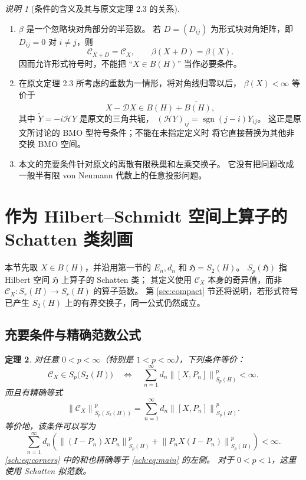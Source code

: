 \documentclass[UTF8,11pt,a4paper,fontset=fandol]{ctexart}
\newtheorem{theorem}{定理}[section]
\theoremstyle{remark}
\newtheorem{remark}[theorem]{说明}
\newcommand{\DD}{\mathcal D}
\newcommand{\TriH}{\mathcal H}
\newcommand{\CC}{\mathcal C}
\newcommand{\norm}[1]{\left\lVert #1\right\rVert}
\newcommand{\HS}{\mathfrak H}
\numberwithin{equation}{section}
\begin{document}
\begin{remark}[条件的含义及其与原文定理 2.3 的关系]
\leavevmode
\begin{enumerate}[label=\textup{(\arabic*)}]
 \item $\beta$ 是一个忽略块对角部分的半范数。
 若 $D=(D_{ij})$ 为形式块对角矩阵，即 $D_{ij}=0$ 对 $i\ne j$，则
 \[
  \CC_{X+D}=\CC_X,\qquad\beta(X+D)=\beta(X).
 \]
 因而允许形式符号时，不能把 ``$X\in B(H)$'' 当作必要条件。
 \item 在原文定理 2.3 所考虑的重数为一情形，将对角线归零以后，
 $\beta(X)<\infty$ 等价于
 \[
 X-\DD X\in B(H)+\widetilde{B(H)},
 \]
 其中 $\widetilde Y=-i\TriH Y$ 是原文的三角共轭，
 $(\TriH Y)_{ij}=\operatorname{sgn}(j-i)Y_{ij}$。
 这正是原文所讨论的 BMO 型符号条件；不能在未指定定义时
 将它直接替换为其他非交换 BMO 空间。
 \item 本文的充要条件针对原文的离散有限秩巢和左乘交换子。
 它没有把问题改成一般半有限 von Neumann 代数上的任意投影问题。
\end{enumerate}
\end{remark}

\section{作为 Hilbert--Schmidt 空间上算子的 Schatten 类刻画}

本节先取 $X\in B(H)$，并沿用第一节的 $E_n,d_n$ 和 $\HS=S_2(H)$。
$S_p(\HS)$ 指 Hilbert 空间 $\HS$ 上算子的 Schatten 类；
其定义使用 $\CC_X$ 本身的奇异值，而非 $\CC_X:S_r(H)\to S_r(H)$ 的算子范数。
第 \ref{sec:compact} 节还将说明，若形式符号已产生 $S_2(H)$ 上的有界交换子，同一公式仍然成立。

\subsection{充要条件与精确范数公式}

\begin{theorem}\label{sch:thm:main}
对任意 $0<p<\infty$（特别是 $1<p<\infty$），下列条件等价：
\[
 \boxed{\quad
 \CC_X\in S_p\bigl(S_2(H)\bigr)
 \quad\Longleftrightarrow\quad
 \sum_{n=1}^{\infty}d_n\norm{[X,P_n]}_{S_p(H)}^p<\infty.
 \quad}
\]
而且有精确等式
\begin{equation}\label{sch:eq:main}
 \norm{\CC_X}_{S_p(S_2(H))}^p
 =\sum_{n=1}^{\infty}d_n\norm{[X,P_n]}_{S_p(H)}^p.
\end{equation}
等价地，该条件可以写为
\begin{equation}\label{sch:eq:corners}
 \boxed{\quad
 \sum_{n=1}^{\infty}d_n\left(
 \norm{(I-P_n)XP_n}_{S_p(H)}^p
 +\norm{P_nX(I-P_n)}_{S_p(H)}^p\right)<\infty.
 \quad}
\end{equation}
\eqref{sch:eq:corners} 中的和也精确等于 \eqref{sch:eq:main} 的左侧。
对于 $0<p<1$，这里使用 Schatten 拟范数。
\end{theorem}
\end{document}
